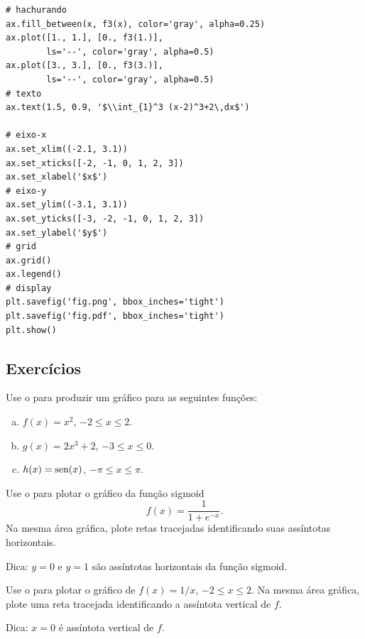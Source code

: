 \begin{ex}
\begin{lstlisting}
# hachurando
ax.fill_between(x, f3(x), color='gray', alpha=0.25)
ax.plot([1., 1.], [0., f3(1.)],
        ls='--', color='gray', alpha=0.5)
ax.plot([3., 3.], [0., f3(3.)],
        ls='--', color='gray', alpha=0.5)
# texto
ax.text(1.5, 0.9, '$\\int_{1}^3 (x-2)^3+2\,dx$')

# eixo-x
ax.set_xlim((-2.1, 3.1))
ax.set_xticks([-2, -1, 0, 1, 2, 3])
ax.set_xlabel('$x$')
# eixo-y
ax.set_ylim((-3.1, 3.1))
ax.set_yticks([-3, -2, -1, 0, 1, 2, 3])
ax.set_ylabel('$y$')
# grid
ax.grid()
ax.legend()
# display
plt.savefig('fig.png', bbox_inches='tight')
plt.savefig('fig.pdf', bbox_inches='tight')
plt.show()
\end{lstlisting}
\end{ex}

\subsection{Exercícios}

\begin{exer}
  Use o {\matplotlib} para produzir um gráfico para as seguintes funções:
  \begin{enumerate}[a)]
  \item $\displaystyle f(x) = x^2$, $-2 \leq x \leq 2$.
  \item $\displaystyle g(x) = 2x^3+2$, $-3 \leq x \leq 0$.
  \item $\displaystyle h(x) = \operatorname{sen}(x)$, $-\pi \leq x \leq \pi$.
  \end{enumerate}
\end{exer}

\begin{exer}
  Use o {\matplotlib} para plotar o gráfico da função sigmoid
  \begin{equation}
    f(x) = \frac{1}{1 + e^{-x}}.
  \end{equation}
  Na mesma área gráfica, plote retas tracejadas identificando suas assíntotas horizontais.
\end{exer}
\begin{resp}
  Dica: $y = 0$ e $y=1$ são assíntotas horizontais da função sigmoid.
\end{resp}

\begin{exer}
  Use o {\matplotlib} para plotar o gráfico de $f(x) = 1/x$, $-2 \leq x \leq 2$. Na mesma área gráfica, plote uma reta tracejada identificando a assíntota vertical de $f$.
\end{exer}
\begin{resp}
  Dica: $x = 0$ é assíntota vertical de $f$.
\end{resp}


